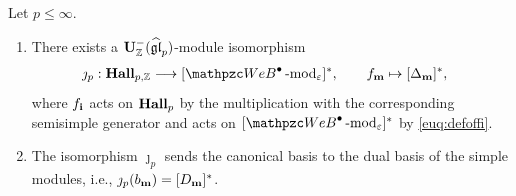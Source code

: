  \begin{theorem}
 \label{thm:Cat_affine}
 Let $p\le \infty$.
 \begin{enumerate}
     \item 
     There exists a $\bold{U}_{\mathbb{Z}}^-(\widehat{\mathfrak{gl}}_p)$-module isomorphism
\begin{align}
\label{eq:simple=dCB:p}
\jmath_p: \HallZ &\longrightarrow [\qAW \modf_\eps]^*,
\qquad
f_\bfm \mapsto [\Delta_{\bfm}]^*,
\end{align}
where $f_{\mathbf{i}}$ acts on $\bold{Hall}_{p}$ by the multiplication with the corresponding semisimple generator and 
acts on $[\qAW \modf_\eps]^*$ by \eqref{euq:defoffi}.
\item The isomorphism $\jmath_p$ sends the canonical basis to the dual basis of the simple modules, i.e., $\jmath_p(b_{\mathbf{m}})=[D_{\mathbf{m}}]^*$.
 \end{enumerate}
\end{theorem}
 
